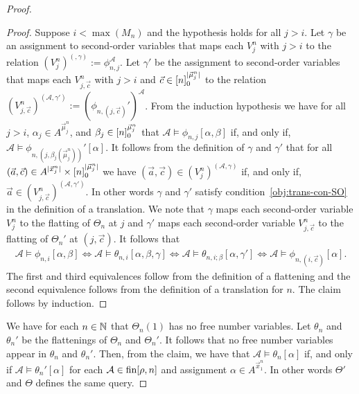\documentclass[../main/thesis.tex]{subfiles}
\begin{document}
\begin{proof}
\begin{proof}
    Suppose $i < \max(M_n)$ and the hypothesis holds for all $j > i$. Let
    $\gamma$ be an assignment to second-order variables that maps each $V^n_j$
    with $j > i$ to the relation $(V^n_j)^{(\mathcal, \gamma)} :=
    \phi^{\mathcal{A}}_{n, j}$. Let $\gamma'$ be the assignment to second-order
    variables that maps each $V^n_{j, \vec{c}}$ with $j > i$ and $\vec{c} \in
    [n]^{\vert \vec{\mu}^n_j \vert}_0$ to the relation $(V^n_{j,
      \vec{c}})^{(\mathcal{A}, \gamma')} := (\phi_{n, (j,
      \vec{c})}')^{\mathcal{A}}$. From the induction hypothesis we have for all
    $j > i$, $\alpha_j \in A^{\vec{\mu}^n_j}$, and $\beta_j\in
    [n]^{\vec{\mu}^n_j}_0$ that $\mathcal{A} \models \phi_{n, j}[\alpha,
    \beta]$ if, and only if, $\mathcal{A} \models \phi_{n, (j,
      \beta_j(\vec{\mu}^n_j))}' [\alpha]$. It follows from the definition of
    $\gamma$ and $\gamma'$ that for all $(\vec{a}, \vec{c}) \in A^{\vert
      \vec{x}^n_j\vert} \times [n]^{\vert \vec{\mu}^n_j \vert}_0$ we have
    $(\vec{a}, \vec{c}) \in (V^n_{j})^{(\mathcal{A}, \gamma)}$ if, and only if,
    $\vec{a} \in (V^n_{j, \vec{c}})^{(\mathcal{A}, \gamma')}$. In other words
    $\gamma$ and $\gamma'$ satisfy condition~\ref{obj:trans-con-SO} in the
    definition of a translation. We note that $\gamma$ maps each second-order
    variable $V^n_{j}$ to the flatting of $\Theta_n$ at $j$ and $\gamma'$ maps
    each second-order variable $V^n_{j, \vec{c}}$ to the flatting of $\Theta_n'$
    at $(j, \vec{c})$. It follows that
    \begin{align*}
      \mathcal{A} \models \phi_{n, i} [\alpha, \beta] \iff \mathcal{A} \models \theta_{n, i}[\alpha, \beta, \gamma] \iff \mathcal{A} \models \theta_{n, i ; \beta}[\alpha, \gamma'] \iff \mathcal{A} \models \phi_{n, (i, \vec{c})}[\alpha].
    \end{align*}
    The first and third equivalences follow from the definition of a flattening
    and the second equivalence follows from the definition of a translation for
    $n$. The claim follows by induction.
  \end{proof}

  We have for each $n \in \mathbb{N}$ that $\Theta_n(1)$ has no free number
  variables. Let $\theta_n$ and $\theta_n'$ be the flattenings of $\Theta_n$ and
  $\Theta_n'$. It follows that no free number variables appear in $\theta_n$ and
  $\theta_n'$. Then, from the claim, we have that $\mathcal{A} \models
  \theta_n[\alpha]$ if, and only if $\mathcal{A} \models \theta_n'[\alpha]$ for
  each $\mathcal{A} \in \text{\upshape fin}{[\rho, n]}$ and assignment $\alpha \in
  A^{\vec{x}^n_1}$. In other words $\Theta'$ and $\Theta$ defines the same
  query.


\end{proof}
\end{document}
